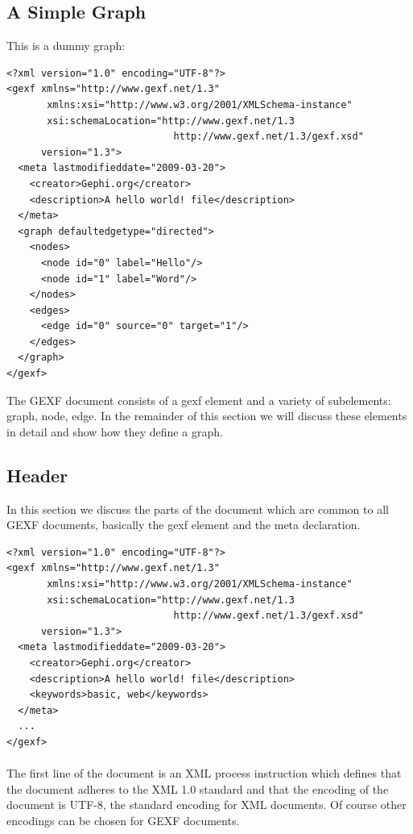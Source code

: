 \documentclass[a4paper,10pt]{article}
\begin{document}
\subsection{A Simple Graph}

This is a dummy graph:

\lstset{ style=gexf }
\begin{lstlisting}[caption={Hello world!},label=helloworld]
<?xml version="1.0" encoding="UTF-8"?>
<gexf xmlns="http://www.gexf.net/1.3"
       xmlns:xsi="http://www.w3.org/2001/XMLSchema-instance"
       xsi:schemaLocation="http://www.gexf.net/1.3
                             http://www.gexf.net/1.3/gexf.xsd"
      version="1.3">
  <meta lastmodifieddate="2009-03-20">
    <creator>Gephi.org</creator>
    <description>A hello world! file</description>
  </meta>
  <graph defaultedgetype="directed">
    <nodes>
      <node id="0" label="Hello"/>
      <node id="1" label="Word"/>
    </nodes>
    <edges>
      <edge id="0" source="0" target="1"/>
    </edges>
  </graph>
</gexf>
\end{lstlisting}

The GEXF document consists of a gexf element and a variety of subelements: graph, node, edge. In the remainder of this section we will discuss these elements in detail and show how they define a graph.

\subsection{Header}

In this section we discuss the parts of the document which are common to all GEXF documents, basically the gexf element and the meta declaration.

\lstset{ style=gexf }
\begin{lstlisting}[caption={Header},label=header]
<?xml version="1.0" encoding="UTF-8"?>
<gexf xmlns="http://www.gexf.net/1.3"
       xmlns:xsi="http://www.w3.org/2001/XMLSchema-instance"
       xsi:schemaLocation="http://www.gexf.net/1.3
                             http://www.gexf.net/1.3/gexf.xsd"
      version="1.3">
  <meta lastmodifieddate="2009-03-20">
    <creator>Gephi.org</creator>
    <description>A hello world! file</description>
    <keywords>basic, web</keywords>
  </meta>
  ...
</gexf>
\end{lstlisting}

\paragraph{}
The first line of the document is an XML process instruction which defines that the document adheres to the XML 1.0 standard and that the encoding of the document is UTF-8, the standard encoding for XML documents. Of course other encodings can be chosen for GEXF documents.
\end{document}
